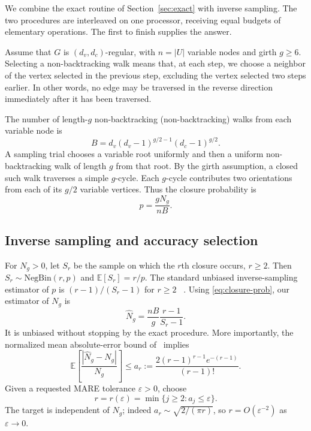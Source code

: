 \documentclass[conference]{IEEEtran}
\begin{document}
We combine the exact routine of Section~\ref{sec:exact} with inverse
sampling. The two procedures
are interleaved on one processor, receiving equal budgets of
elementary operations. The first to finish supplies the answer.

Assume that $G$ is $(d_v,d_c)$-regular, with $n=|U|$ variable
nodes and girth $g\ge6$. 
Selecting a non-backtracking walk means that, at each step, we choose a neighbor of the vertex selected in the previous step, excluding the vertex selected two steps earlier. In other words, no edge may be traversed in the reverse direction immediately after it has been traversed.

The number of length-$g$ non-backtracking
(non-backtracking) walks from each variable node is
\begin{equation}\label{eq:B}
 B=d_v(d_v-1)^{g/2-1}(d_c-1)^{g/2}.
\end{equation}
A sampling trial chooses a variable root uniformly and then a
uniform non-backtracking walk of length $g$ from that root. By the girth
assumption, a closed such walk traverses a simple $g$-cycle.
Each $g$-cycle contributes two orientations from each of its
$g/2$ variable vertices. Thus the closure probability is
\begin{equation}\label{eq:closure-prob}
 p=\frac{gN_g}{nB}.
\end{equation}

\subsection{Inverse sampling and accuracy selection}
For $N_g>0$, let $S_r$ be the sample on which the $r$th
closure occurs, $r\ge2$. Then
$S_r\sim\mathrm{NegBin}(r,p)$ and $\mathbb E[S_r]=r/p$.
The standard unbiased inverse-sampling estimator
of $p$ is $(r-1)/(S_r-1)$ for $r\ge2$
~\cite{mendo2009}. Using \eqref{eq:closure-prob},
our estimator of $N_g$ is
\begin{equation}\label{eq:inverse-est}
 \widehat N_g=\frac{nB}{g}\frac{r-1}{S_r-1}.
\end{equation}
It is unbiased without stopping by the exact procedure.
More importantly, the normalized mean absolute-error bound
of~\cite{mendo2009} implies
\begin{equation}\label{eq:mendo-bound}
 \mathbb E\!\left[\frac{|\widehat N_g-N_g|}{N_g}\right]
 \le a_r:=
 \frac{2(r-1)^{r-1}e^{-(r-1)}}{(r-1)!}.
\end{equation}
Given a requested MARE tolerance $\varepsilon>0$, choose
\begin{equation}\label{eq:r-eps}
 r=r(\varepsilon)=\min\{j\ge2:a_j\le\varepsilon\}.
\end{equation}
The target is independent of $N_g$; indeed
$a_r\sim\sqrt{2/(\pi r)}$, so $r=O(\varepsilon^{-2})$
as $\varepsilon\rightarrow0$.
\end{document}
